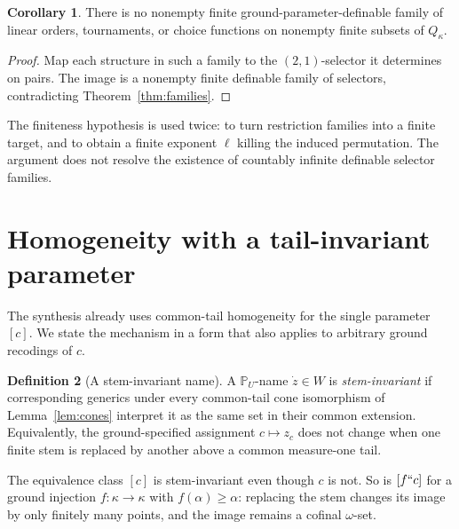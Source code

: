 \documentclass[11pt,letterpaper]{article}
\theoremstyle{definition}
\newtheorem{definition}{Definition}[section]
\newtheorem{corollary}[definition]{Corollary}
\numberwithin{equation}{section}
\newcommand{\PP}{\mathbb P}
\begin{document}
\begin{corollary}\label{cor:finiteorders}
There is no nonempty finite ground-parameter-definable family of linear orders, tournaments, or choice functions on nonempty finite subsets of $Q_\kappa$.
\end{corollary}
\begin{proof}
Map each structure in such a family to the $(2,1)$-selector it determines on pairs. The image is a nonempty finite definable family of selectors, contradicting Theorem~\ref{thm:families}.
\end{proof}

The finiteness hypothesis is used twice: to turn restriction families into a finite target, and to obtain a finite exponent $\ell$ killing the induced permutation. The argument does not resolve the existence of countably infinite definable selector families.

\section{Homogeneity with a tail-invariant parameter}\label{sec:homogeneity}

The synthesis already uses common-tail homogeneity for the single parameter $[c]$. We state the mechanism in a form that also applies to arbitrary ground recodings of $c$.

\begin{definition}[A stem-invariant name]
A $\PP_U$-name $\dot z\in W$ is \emph{stem-invariant} if corresponding generics under every common-tail cone isomorphism of Lemma~\ref{lem:cones} interpret it as the same set in their common extension. Equivalently, the ground-specified assignment $c\mapsto z_c$ does not change when one finite stem is replaced by another above a common measure-one tail.
\end{definition}

The equivalence class $[c]$ is stem-invariant even though $c$ is not. So is $[f``c]$ for a ground injection $f:\kappa\to\kappa$ with $f(\alpha)\ge\alpha$: replacing the stem changes its image by only finitely many points, and the image remains a cofinal $\omega$-set.
\end{document}
